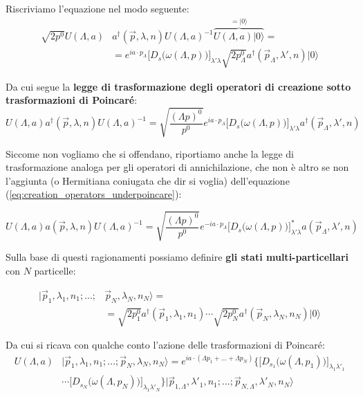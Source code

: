 \documentclass[../main.tex]{subfiles}
\begin{document}
Riscriviamo l'equazione nel modo seguente:
\[
\begin{aligned}
    \sqrt{2p^0} U(\Lambda, a) &a^\dagger(\Vec{p},\lambda,n)U(\Lambda, a)^{-1}\overbrace{U(\Lambda, a)|0\rangle}^{=|0\rangle} =\\
    &=e^{ia\cdot p_\Lambda}\Big[D_s\big(\omega(\Lambda, p)\big)\Big]_{\lambda'\lambda}\sqrt{2p^0_\Lambda}a^\dagger(\Vec{p}_\Lambda,\lambda' 
    ,n)|0\rangle
\end{aligned}
\]

Da cui segue la \textbf{legge di trasformazione degli operatori di creazione sotto trasformazioni di Poincaré}:
\begin{equation}
     \boxed{U(\Lambda, a)a^\dagger(\Vec{p},\lambda,n)U(\Lambda, a)^{-1} =\sqrt{\frac{(\Lambda p)^0}{p^0}} e^{ia\cdot p_\Lambda}\Big[D_s\big(\omega(\Lambda, p)\big)\Big]_{\lambda'\lambda}a^\dagger(\Vec{p}_\Lambda,\lambda',n)}
    \label{eq:creation_operators_underpoincare}
\end{equation}

Siccome non vogliamo che si offendano, riportiamo anche la legge di trasformazione analoga per gli operatori di annichilazione, che non è altro se non l'aggiunta (o Hermitiana coniugata che dir si voglia) dell'equazione (\ref{eq:creation_operators_underpoincare}):

\begin{equation}
     \boxed{U(\Lambda, a)a(\Vec{p},\lambda,n)U(\Lambda, a)^{-1} =\sqrt{\frac{(\Lambda p)^0}{p^0}} e^{-ia\cdot p_\Lambda}\Big[D_s\big(\omega(\Lambda, p)\big)\Big]^\ast_{\lambda'\lambda}a(\Vec{p}_\Lambda,\lambda',n)}
    \label{eq:annihil_operators_underpoincare}
\end{equation}

Sulla base di questi ragionamenti possiamo definire \textbf{gli stati multi-particellari} con $N$ particelle:

\begin{equation}
    \begin{aligned}
        |\Vec{p}_1,\lambda_1,n_1; ...; &\Vec{p}_N,\lambda_N,n_N\rangle = \\
        &= \sqrt{2p^0_1} a^\dagger(\Vec{p}_1,\lambda_1,n_1)\cdots\sqrt{2p^0_N} a^\dagger(\Vec{p}_N,\lambda_N,n_N)|0\rangle
    \end{aligned}
    \label{eq:multiparticlestate}
\end{equation}

Da cui si ricava con qualche conto l'azione delle trasformazioni di Poincaré:
\begin{equation}
    \begin{aligned}
        U(\Lambda, a)&|\Vec{p}_1,\lambda_1,n_1; ...; \Vec{p}_N,\lambda_N,n_N\rangle = e^{ia\cdot (\Lambda p_1+...+\Lambda p_N)}\bigg\{\Big[D_{s_1}\big(\omega(\Lambda, p_1)\big)\Big]_{\lambda_1\lambda'_1}\\
        & \cdots \Big[D_{s_N}\big(\omega(\Lambda, p_N)\big)\Big]_{\lambda_1\lambda'_N} \bigg\}|\Vec{p}_{1,\Lambda},\lambda'_1,n_1; ...; \Vec{p}_{N,\Lambda},\lambda'_N,n_N\rangle
    \end{aligned}
    \label{eq:poincare_onmultiparticlestate}
\end{equation}
\end{document}
